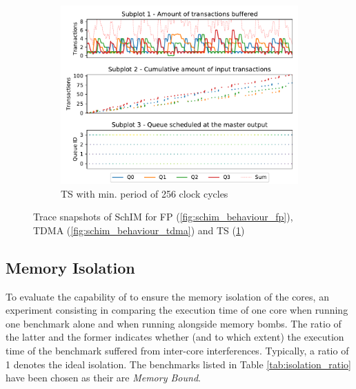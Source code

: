 \begin{figure}[]
\begin{subfigure}{0.5\textwidth}
      \end{subfigure}
      \vfill
      \begin{subfigure}{0.5\textwidth}
        \centering
        \includegraphics[scale=0.55]{images/SchIM_MG_buffering.pdf}
        \caption{TS with min. period of 256 clock cycles}
        \label{fig:schim_behaviour_mg}
      \end{subfigure}
      \caption{Trace snapshots of SchIM for FP (\ref{fig:schim_behaviour_fp}), TDMA (\ref{fig:schim_behaviour_tdma}) and TS (\ref{fig:schim_behaviour_mg})}
      \label{fig:schim_behaviour}
    \end{figure}

  \subsection{Memory Isolation}\label{subsec:isolation}
    To evaluate the capability of \schim to ensure the memory isolation of the cores, an experiment consisting in comparing the execution time of one core when running one benchmark alone and when running alongside memory bombs. The ratio of the latter and the former indicates whether (and to which extent) the execution time of the benchmark suffered from inter-core interferences. Typically, a ratio of 1 denotes the ideal isolation. The benchmarks listed in Table \ref{tab:isolation_ratio} have been chosen as their are \emph{Memory Bound}.
    
